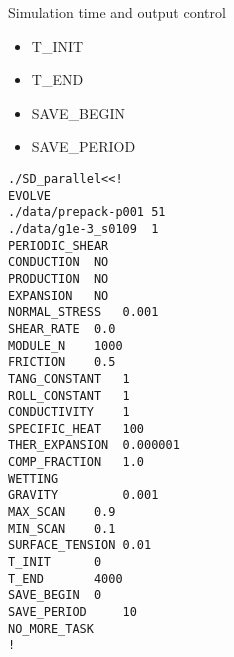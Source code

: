 \documentclass[11pt, a4paper]{report}
\begin{document}
Simulation time and output control
\begin{itemize}\itemsep -2pt
 \item T\_INIT
 \item T\_END
 \item SAVE\_BEGIN
 \item SAVE\_PERIOD 
\end{itemize}

\begin{lstlisting}[caption="Typical script for input parameters."]
./SD_parallel<<!
EVOLVE 
./data/prepack-p001	51	
./data/g1e-3_s0109  1
PERIODIC_SHEAR
CONDUCTION	NO
PRODUCTION	NO
EXPANSION	NO
NORMAL_STRESS 	0.001
SHEAR_RATE	0.0
MODULE_N 	1000
FRICTION 	0.5
TANG_CONSTANT 	1
ROLL_CONSTANT 	1
CONDUCTIVITY	1
SPECIFIC_HEAT	100
THER_EXPANSION  0.000001
COMP_FRACTION	1.0
WETTING
GRAVITY         0.001
MAX_SCAN	0.9
MIN_SCAN	0.1
SURFACE_TENSION 0.01
T_INIT		0
T_END		4000
SAVE_BEGIN	0
SAVE_PERIOD     10	
NO_MORE_TASK
!
\end{lstlisting}

%

\end{document}

